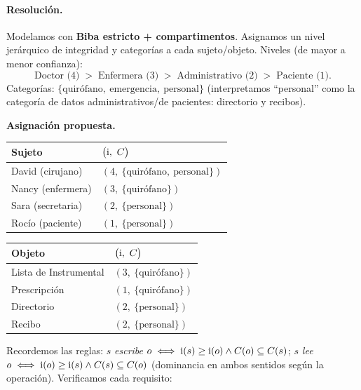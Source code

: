 \paragraph{Resolución.}
Modelamos con \textbf{Biba estricto + compartimentos}. Asignamos un nivel jerárquico de
integridad y categorías a cada sujeto/objeto. Niveles (de mayor a menor confianza):
\[
\text{Doctor (4)} \;>\; \text{Enfermera (3)} \;>\; \text{Administrativo (2)} \;>\; \text{Paciente (1)} .
\]
Categorías: $\{\text{quirófano},\ \text{emergencia},\ \text{personal}\}$ (interpretamos
``personal'' como la categoría de datos administrativos/de pacientes: directorio y recibos).

\medskip
\noindent\textbf{Asignación propuesta.}
\begin{center}
\renewcommand{\arraystretch}{1.2}
\begin{tabular}{l l}
\toprule
\textbf{Sujeto} & $\bigl(\il,\ C\bigr)$ \\
\midrule
David (cirujano)      & $(4,\ \{\text{quirófano},\ \text{personal}\})$ \\
Nancy (enfermera)     & $(3,\ \{\text{quirófano}\})$ \\
Sara (secretaria)     & $(2,\ \{\text{personal}\})$ \\
Rocío (paciente)      & $(1,\ \{\text{personal}\})$ \\
\bottomrule
\end{tabular}
\qquad
\begin{tabular}{l l}
\toprule
\textbf{Objeto} & $\bigl(\il,\ C\bigr)$ \\
\midrule
Lista de Instrumental & $(3,\ \{\text{quirófano}\})$ \\
Prescripción          & $(1,\ \{\text{quirófano}\})$ \\
Directorio            & $(2,\ \{\text{personal}\})$ \\
Recibo                & $(2,\ \{\text{personal}\})$ \\
\bottomrule
\end{tabular}
\end{center}

Recordemos las reglas: $s$ \emph{escribe} $o \iff \mathrm{i}(s)\ge\mathrm{i}(o) \wedge C(o)\subseteq C(s)$;\quad
$s$ \emph{lee} $o \iff \mathrm{i}(o)\ge\mathrm{i}(s) \wedge C(s)\subseteq C(o)$ (dominancia en ambos sentidos
según la operación). Verificamos cada requisito:

